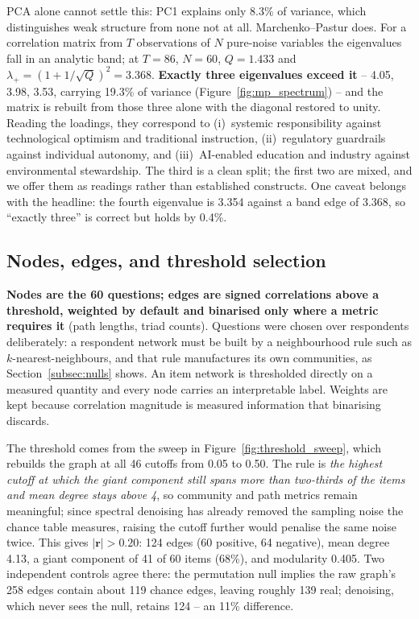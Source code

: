 PCA alone cannot settle this: PC1 explains only 8.3\% of variance, which distinguishes
weak structure from none not at all. Marchenko--Pastur does. For a correlation matrix from
$T$ observations of $N$ pure-noise variables the eigenvalues fall in an analytic band; at
$T=86$, $N=60$, $Q=1.433$ and $\lambda_{+}=(1+1/\sqrt{Q})^2=3.368$. \textbf{Exactly three
eigenvalues exceed it} -- 4.05, 3.98, 3.53, carrying 19.3\% of variance
(Figure~\ref{fig:mp_spectrum}) -- and the matrix is rebuilt from those three alone with the
diagonal restored to unity. Reading the loadings, they correspond to (i)~systemic
responsibility against technological optimism and traditional instruction,
(ii)~regulatory guardrails against individual autonomy, and (iii)~AI-enabled education and
industry against environmental stewardship. The third is a clean split; the first two are
mixed, and we offer them as readings rather than established constructs. One caveat
belongs with the headline: the fourth eigenvalue is 3.354 against a band edge of 3.368, so
``exactly three'' is correct but holds by 0.4\%.

\subsection{Nodes, edges, and threshold selection}

\textbf{Nodes are the 60 questions; edges are signed correlations above a threshold,
weighted by default and binarised only where a metric requires it} (path lengths, triad
counts). Questions were chosen over respondents deliberately: a respondent network must be
built by a neighbourhood rule such as $k$-nearest-neighbours, and that rule manufactures
its own communities, as Section~\ref{subsec:nulls} shows. An item network is thresholded
directly on a measured quantity and every node carries an interpretable label. Weights are
kept because correlation magnitude is measured information that binarising discards.

The threshold comes from the sweep in Figure~\ref{fig:threshold_sweep}, which rebuilds the
graph at all 46 cutoffs from 0.05 to 0.50. The rule is \emph{the highest cutoff at which
the giant component still spans more than two-thirds of the items and mean degree stays
above 4}, so community and path metrics remain meaningful; since spectral denoising has
already removed the sampling noise the chance table measures, raising the cutoff further
would penalise the same noise twice. This gives $\mathbf{|r|>0.20}$: 124 edges (60
positive, 64 negative), mean degree 4.13, a giant component of 41 of 60 items (68\%), and
modularity 0.405. Two independent controls agree there: the permutation null implies the
raw graph's 258 edges contain about 119 chance edges, leaving roughly 139 real; denoising,
which never sees the null, retains 124 -- an 11\% difference.

